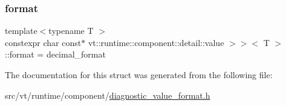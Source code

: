 \subsubsection{\texorpdfstring{format}{format}}
{\footnotesize\ttfamily template$<$typename T $>$ \\
constexpr char const$\ast$ vt\+::runtime\+::component\+::detail\+::value $>$$>$$<$ T $>$\+::format = decimal\+\_\+format\hspace{0.3cm}{\ttfamily [static]}}



The documentation for this struct was generated from the following file\+:\begin{DoxyCompactItemize}
\item 
src/vt/runtime/component/\hyperlink{diagnostic__value__format_8h}{diagnostic\+\_\+value\+\_\+format.\+h}\end{DoxyCompactItemize}
